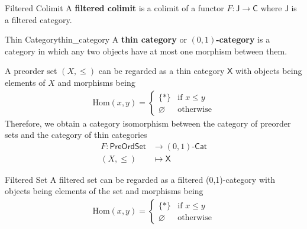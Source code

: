 \begin{definition}{Filtered Colimit}{}
    A \textbf{filtered colimit} is a colimit of a functor $F: \mathsf{J} \rightarrow \mathsf{C}$ where $\mathsf{J}$ is a filtered category.
\end{definition}


\begin{definition}{Thin Category}{thin_category}
    A \textbf{thin category} or \textbf{$(0,1)$-category} is a category in which any two objects have at most one morphism between them. 

    A preorder set $(X,\leq)$ can be regarded as a thin category $\mathsf{X}$ with objects being elements of $X$ and morphisms being
    \begin{align*}
        \mathrm{Hom}(x,y)=\begin{cases}
            \{*\} & \text{if }x\leq y\\
            \varnothing & \text{otherwise}
        \end{cases}
    \end{align*}
    Therefore, we obtain a category isomorphism between the category of preorder sets and the category of thin categories
    \begin{align*}
        F:\mathsf{PreOrdSet}&\longrightarrow (0,1)\text{-}\mathsf{Cat}\\
        (X,\leq)&\longmapsto \mathsf{X}
    \end{align*}
\end{definition}


\begin{example}{Filtered Set}{}
    A filtered set can be regarded as a filtered (0,1)-category with objects being elements of the set and morphisms being
    \begin{align*}
        \mathrm{Hom}(x,y)=\begin{cases}
            \{*\} & \text{if }x\leq y\\
            \varnothing & \text{otherwise}
        \end{cases}
    \end{align*}
\end{example}


